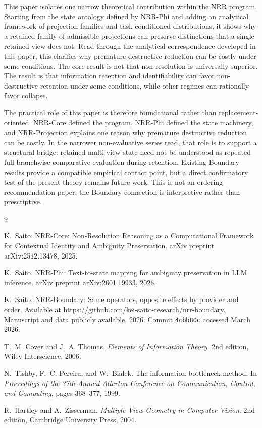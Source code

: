 \documentclass[11pt,a4paper]{article}
\begin{document}
This paper isolates one narrow theoretical contribution within the NRR program. Starting from the state ontology defined by NRR-Phi \cite{saito2026phi} and adding an analytical framework of projection families and task-conditioned distributions, it shows why a retained family of admissible projections can preserve distinctions that a single retained view does not. Read through the analytical correspondence developed in this paper, this clarifies why premature destructive reduction can be costly under some conditions. The core result is not that non-resolution is universally superior. The result is that information retention and identifiability can favor non-destructive retention under some conditions, while other regimes can rationally favor collapse.

The practical role of this paper is therefore foundational rather than replacement-oriented. NRR-Core \cite{saito2025nrr} defined the program, NRR-Phi \cite{saito2026phi} defined the state machinery, and NRR-Projection explains one reason why premature destructive reduction can be costly. In the narrower non-evaluative series read, that role is to support a structural bridge: retained multi-view state need not be understood as repeated full branchwise comparative evaluation during retention. Existing Boundary results \cite{saito2026boundary} provide a compatible empirical contact point, but a direct confirmatory test of the present theory remains future work. This is not an ordering-recommendation paper; the Boundary connection is interpretive rather than prescriptive.

\begin{thebibliography}{9}

K.~Saito.
\newblock NRR-Core: Non-Resolution Reasoning as a Computational Framework for Contextual Identity and Ambiguity Preservation.
\newblock arXiv preprint arXiv:2512.13478, 2025.

K.~Saito.
\newblock NRR-Phi: Text-to-state mapping for ambiguity preservation in LLM inference.
\newblock arXiv preprint arXiv:2601.19933, 2026.

K.~Saito.
\newblock NRR-Boundary: Same operators, opposite effects by provider and order.
\newblock Available at \url{https://github.com/kei-saito-research/nrr-boundary}. Manuscript and data publicly available, 2026. Commit \texttt{4cbb80c} accessed March 2026.

T.~M. Cover and J.~A. Thomas.
\newblock \emph{Elements of Information Theory}.
\newblock 2nd edition, Wiley-Interscience, 2006.

N.~Tishby, F.~C. Pereira, and W.~Bialek.
\newblock The information bottleneck method.
\newblock In \emph{Proceedings of the 37th Annual Allerton Conference on Communication, Control, and Computing}, pages 368--377, 1999.

R.~Hartley and A.~Zisserman.
\newblock \emph{Multiple View Geometry in Computer Vision}.
\newblock 2nd edition, Cambridge University Press, 2004.

\end{thebibliography}
\end{document}
